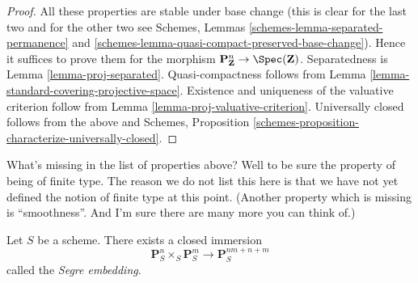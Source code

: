 \begin{proof}
All these properties are stable under base change (this is clear for the
last two and for the other two see
Schemes, Lemmas
\ref{schemes-lemma-separated-permanence} and
\ref{schemes-lemma-quasi-compact-preserved-base-change}).
Hence it suffices to prove them for the morphism
$\mathbf{P}^n_{\mathbf{Z}} \to \Spec(\mathbf{Z})$.
Separatedness is Lemma \ref{lemma-proj-separated}. Quasi-compactness follows
from Lemma \ref{lemma-standard-covering-projective-space}.
Existence and uniqueness of the valuative criterion follow from
Lemma \ref{lemma-proj-valuative-criterion}.
Universally closed follows from the above and
Schemes, Proposition \ref{schemes-proposition-characterize-universally-closed}.
\end{proof}

\begin{remark}
\label{remark-missing-finite-type}
What's missing in the list of properties above? Well to be sure the property
of being of finite type. The reason we do not list this here is that we have
not yet defined the notion of finite type at this point. (Another property
which is missing is ``smoothness''. And I'm sure there are many more you can
think of.)
\end{remark}

\begin{lemma}
\label{lemma-segre-embedding}
Let $S$ be a scheme. There exists a closed immersion
$$
\mathbf{P}^n_S \times_S \mathbf{P}^m_S
\longrightarrow
\mathbf{P}^{nm + n + m}_S
$$
called the {\it Segre embedding}.
\end{lemma}

